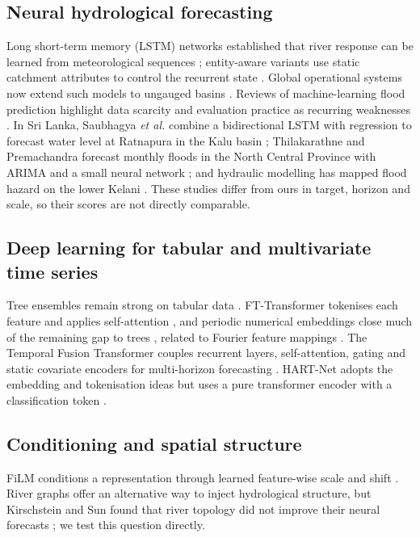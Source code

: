 \documentclass[conference]{IEEEtran}
\newcommand{\model}{HART-Net}
\begin{document}
\subsection{Neural hydrological forecasting}
Long short-term memory (LSTM) networks \cite{hochreiter1997} established that
river response can be learned from meteorological sequences
\cite{kratzert2018}; entity-aware variants use static catchment attributes to
control the recurrent state \cite{kratzert2019}. Global operational systems now
extend such models to ungauged basins \cite{nearing2024}. Reviews of
machine-learning flood prediction highlight data scarcity and evaluation
practice as recurring weaknesses \cite{mosavi2018}. In Sri Lanka, Saubhagya
\emph{et al.} combine a bidirectional LSTM with regression to forecast water
level at Ratnapura in the Kalu basin \cite{saubhagya2025}; Thilakarathne and
Premachandra forecast monthly floods in the North Central Province with ARIMA
and a small neural network \cite{thilakarathne2017}; and hydraulic modelling
has mapped flood hazard on the lower Kelani \cite{gunasekara2008}. These
studies differ from ours in target, horizon and scale, so their scores are not
directly comparable.

\subsection{Deep learning for tabular and multivariate time series}
Tree ensembles remain strong on tabular data \cite{grinsztajn2022,ke2017}.
FT-Transformer tokenises each feature and applies self-attention
\cite{gorishniy2021}, and periodic numerical embeddings close much of the
remaining gap to trees \cite{gorishniy2022}, related to Fourier feature mappings
\cite{tancik2020}. The Temporal Fusion Transformer couples recurrent layers,
self-attention, gating and static covariate encoders for multi-horizon
forecasting \cite{lim2021}. \model{} adopts the embedding and tokenisation ideas
but uses a pure transformer encoder with a classification token \cite{devlin2019}.

\subsection{Conditioning and spatial structure}
FiLM conditions a representation through learned feature-wise scale and shift
\cite{perez2018}. River graphs offer an alternative way to inject hydrological
structure, but Kirschstein and Sun found that river topology did not improve
their neural forecasts \cite{kirschstein2024}; we test this question directly.
\end{document}
